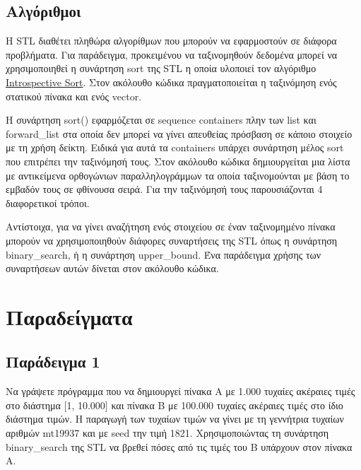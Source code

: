 



\subsection{Αλγόριθμοι}
H STL διαθέτει πληθώρα αλγορίθμων που μπορούν να εφαρμοστούν σε διάφορα προβλήματα. Για παράδειγμα, προκειμένου να ταξινομηθούν δεδομένα μπορεί να χρησιμοποιηθεί η συνάρτηση sort της STL η οποία υλοποιεί τον αλγόριθμο \href{https://xlinux.nist.gov/dads/HTML/introspectiveSort.html}{Introspective Sort}. Στον ακόλουθο κώδικα πραγματοποιείται η ταξινόμηση ενός στατικού πίνακα και ενός vector.





Η συνάρτηση sort() εφαρμόζεται σε sequence containers πλην των list και forward\_list στα οποία δεν μπορεί να γίνει απευθείας πρόσβαση σε κάποιο στοιχείο με τη χρήση δείκτη. Ειδικά για αυτά τα containers υπάρχει συνάρτηση μέλος sort που επιτρέπει την ταξινόμησή τους. Στον ακόλουθο κώδικα δημιουργείται μια λίστα με αντικείμενα ορθογώνιων παραλληλογράμμων τα οποία ταξινομούνται με βάση το εμβαδόν τους σε φθίνουσα σειρά. Για την ταξινόμησή τους παρουσιάζονται 4 διαφορετικοί τρόποι.






Αντίστοιχα, για να γίνει αναζήτηση ενός στοιχείου σε έναν ταξινομημένο πίνακα μπορούν να χρησιμοποιηθούν διάφορες συναρτήσεις της STL όπως η συνάρτηση binary\_search, ή η συνάρτηση upper\_bound. Ένα παράδειγμα χρήσης των συναρτήσεων αυτών δίνεται στον ακόλουθο κώδικα.





\section{Παραδείγματα}
\subsection{Παράδειγμα 1}
Να γράψετε πρόγραμμα που να δημιουργεί πίνακα Α με 1.000 τυχαίες ακέραιες τιμές στο διάστημα [1, 10.000] και πίνακα Β με 100.000 τυχαίες ακέραιες τιμές στο ίδιο διάστημα τιμών. Η παραγωγή των τυχαίων τιμών να γίνει με τη γεννήτρια τυχαίων αριθμών mt19937 και με seed την τιμή 1821. Χρησιμοποιώντας τη συνάρτηση binary\_search της STL να βρεθεί πόσες από τις τιμές του Β υπάρχουν στον πίνακα Α.

